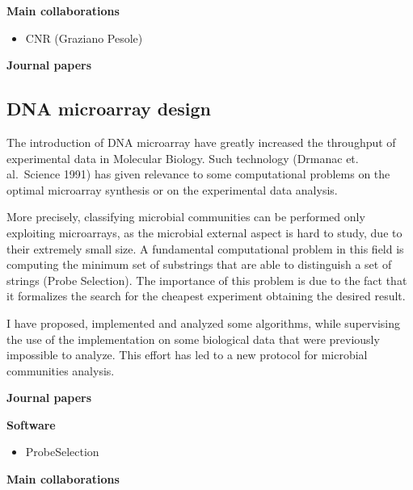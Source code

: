 \documentclass[11pt,a4paper,roman]{moderncv}
\begin{document}
\textbf{Main collaborations}

\begin{itemize}
\item
      CNR (Graziano Pesole)
\end{itemize}

\textbf{Journal papers}

\cite{DBLP:journals/bioinformatics/DentiPPCVRB21}
\cite{DBLP:journals/bmcbi/DentiRBVPB18} \cite{DBLP:journals/jcb/BerettaBVPR14} \cite{DBLP:journals/bmcbi/PirolaRPPVB12}


\subsection{DNA microarray design}\label{dna-microarray-design}

The introduction of DNA microarray have greatly increased the throughput
of experimental data in Molecular Biology. Such technology (Drmanac et.
al.~Science 1991) has given relevance to some computational problems on
the optimal microarray synthesis or on the experimental data analysis.

More precisely, classifying microbial communities can be performed only
exploiting microarrays, as the microbial external aspect is hard to
study, due to their extremely small size. A fundamental computational
problem in this field is computing the minimum set of substrings that
are able to distinguish a set of strings (Probe Selection). The
importance of this problem is due to the fact that it formalizes the
search for the cheapest experiment obtaining the desired result.

I have proposed, implemented and analyzed some algorithms, while
supervising the use of the implementation on some biological data that
were previously impossible to analyze. This effort has led to a new
protocol for microbial communities analysis.

\textbf{Journal  papers}

\cite{DBLP:journals/bmcbi/RueggerVJB11}
\cite{valinskyAnalysisBacterialCommunity2002}
\cite{valinskyOligonucleotideFingerprintingRRNA2002}
\cite{bornemanProbeSelectionAlgorithms2001}

\textbf{Software}

\begin{itemize}
\item
      ProbeSelection
\end{itemize}


\textbf{Main collaborations}
\end{document}
